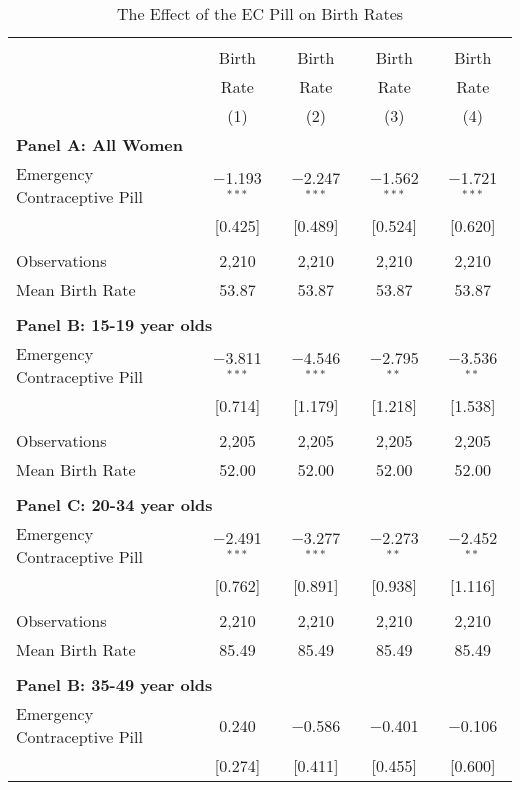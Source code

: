 \begin{table}[!htbp] \centering
\caption{The Effect of the EC Pill on Birth Rates}
\label{TEENtab:aggregateASFR}
\begin{tabular}{@{\extracolsep{5pt}}lcccc}
\\[-1.8ex]\hline \hline \\[-1.8ex] 
& Birth& Birth& Birth& Birth\\
& Rate & Rate & Rate & Rate \\
&(1)&(2)&(3)&(4) \\ \hline
\multicolumn{5}{l}{\textbf{
\noindent Panel A: All Women}} \\
Emergency Contraceptive Pill     &$-$1.193$^{***}$&$-$2.247$^{***}$&$-$1.562$^{***}$&$-$1.721$^{***}$\\
            &[0.425]&[0.489]&[0.524]&[0.620]\\
 & & & & \\
Observations&2,210&2,210&2,210&2,210\\
Mean Birth Rate&53.87&53.87&53.87&53.87\\
 & & & & \\
\multicolumn{5}{l}{\noindent \textbf{
Panel B: 15-19 year olds}} \\
Emergency Contraceptive Pill&$-$3.811$^{***}$&$-$4.546$^{***}$&$-$2.795$^{**}$&$-$3.536$^{**}$\\
            &[0.714]&[1.179]&[1.218]&[1.538]\\
 & & & & \\
Observations&2,205&2,205&2,205&2,205\\
Mean Birth Rate&52.00&52.00&52.00&52.00\\
 & & & & \\
\multicolumn{5}{l}{\noindent \textbf{
Panel C: 20-34 year olds}} \\
Emergency Contraceptive Pill&$-$2.491$^{***}$&$-$3.277$^{***}$&$-$2.273$^{**}$&$-$2.452$^{**}$\\
            &[0.762]&[0.891]&[0.938]&[1.116]\\
 & & & & \\
Observations&2,210&2,210&2,210&2,210\\
Mean Birth Rate&85.49&85.49&85.49&85.49\\
 & & & & \\
\multicolumn{5}{l}{\noindent \textbf{
Panel B: 35-49 year olds}} \\
Emergency Contraceptive Pill&0.240&$-$0.586&$-$0.401&$-$0.106\\
            &[0.274]&[0.411]&[0.455]&[0.600]\\

\end{tabular}
\end{table}

